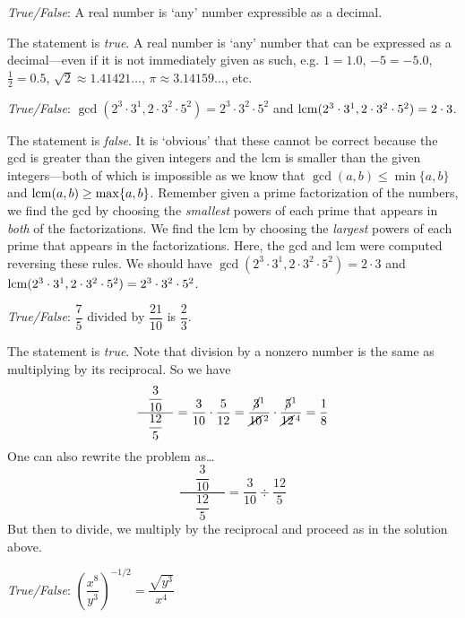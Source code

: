\documentclass[11pt,letterpaper]{article}
\begin{document}
\thispagestyle{title}

\quizsol \textit{True/False}: A real number is `any' number expressible as a decimal. \pspace

\sol The statement is \textit{true}. A real number is `any' number that can be expressed as a decimal---even if it is not immediately given as such, e.g. $1= 1.0$, $-5= -5.0$, $\frac{1}{2}= 0.5$, $\sqrt{2} \approx 1.41421\ldots$, $\pi \approx 3.14159\ldots$, etc. \pvspace{1.5cm}



\quizsol \textit{True/False}: $\gcd(2^3 \cdot 3^1, 2 \cdot 3^2 \cdot 5^2)= 2^3 \cdot 3^2 \cdot 5^2$ and $\operatorname{lcm}(2^3 \cdot 3^1, 2 \cdot 3^2 \cdot 5^2)= 2 \cdot 3$. \pspace

\sol The statement is \textit{false}. It is `obvious' that these cannot be correct because the gcd is greater than the given integers and the lcm is smaller than the given integers---both of which is impossible as we know that $\gcd(a, b) \leq \min\{a, b\}$ and $\operatorname{lcm}(a, b) \geq \max\{a, b\}$. Remember given a prime factorization of the numbers, we find the gcd by choosing the \textit{smallest} powers of each prime that appears in \textit{both} of the factorizations. We find the lcm by choosing the \textit{largest} powers of each prime that appears in the factorizations. Here, the gcd and lcm were computed reversing these rules. We should have $\gcd(2^3 \cdot 3^1, 2 \cdot 3^2 \cdot 5^2)= 2 \cdot 3$ and $\operatorname{lcm}(2^3 \cdot 3^1, 2 \cdot 3^2 \cdot 5^2)= 2^3 \cdot 3^2 \cdot 5^2$. \pvspace{1.5cm}



\quizsol \textit{True/False}: $\dfrac{7}{5}$ divided by $\dfrac{21}{10}$ is $\dfrac{2}{3}$. \pspace

\sol The statement is \textit{true}. Note that division by a nonzero number is the same as multiplying by its reciprocal. So we have
	\[
	\dfrac{\phantom{-}\dfrac{3}{10}\phantom{-}}{\dfrac{12}{5}}= \dfrac{3}{10} \cdot \dfrac{5}{12}= \dfrac{\cancel{3}^1}{\cancel{10}^{\,2}} \cdot \dfrac{\cancel{5}^1}{\cancel{12}^{\,4}}= \dfrac{1}{8}
	\]
One can also rewrite the problem as\dots 
	\[
	\dfrac{\phantom{-}\dfrac{3}{10}\phantom{-}}{\dfrac{12}{5}}= \dfrac{3}{10} \div \dfrac{12}{5}
	\]
But then to divide, we multiply by the reciprocal and proceed as in the solution above. \pvspace{1.5cm}



\quizsol \textit{True/False}: $\left( \dfrac{x^8}{y^3} \right)^{-1/2}= \dfrac{\sqrt{y^3}}{x^4}$ \pspace
\end{document}
